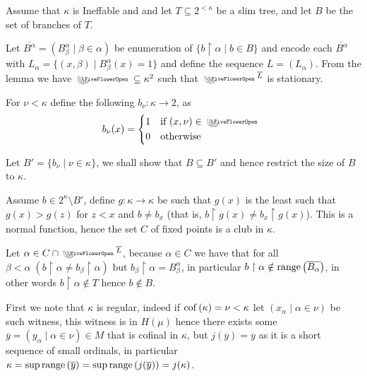 \begin{cExercise}
\begin{cPart}
		
		Assume that $\kappa$ is Ineffable and and let $T\subseteq 2^{<\kappa}$ be a slim tree, and let $B$ be the set of branches of $T$.
		
		Let $\overline{B^\alpha}=(B^\alpha_\beta\mid\beta\in\alpha)$ be enumeration of $\{b\restriction\alpha\mid b\in B\}$ and encode each $\overline{B^\alpha}$ with $L_\alpha=\{(x,\beta)\mid B^\alpha_\beta(x)=1\}$ and define the sequence $\overline{L}=(L_\alpha)$. From the lemma we have $\flower\subseteq \kappa^2$ such that $\flower^{\overline L}$ is stationary.
		
		For $\nu<\kappa$ define the following $b_\nu:\kappa\to 2$, as \begin{equation}
			b_\nu(x) =
			\begin{cases*}
				1 & if $(x,\nu)\in \flower$ \\
				0       & otherwise
			\end{cases*}
		\end{equation} 
		
		
		Let $B'=\{b_\nu\mid\nu\in\kappa\}$, we shall show that $B\subseteq B'$ and hence restrict the size of $B$ to $\kappa$.
		
		Assume $b\in 2^\kappa\setminus B'$, define $g:\kappa\to\kappa$ be such that $g(x)$ is the least such that $g(x)>g(z)$ for $z<x$ and $b\ne b_x$ (that is, $b\restriction g(x)\ne b_x\restriction g(x)$). This is a normal function, hence the set $C$ of fixed points is a club in $\kappa$.
		
		Let $\alpha\in C\cap \flower^{\overline L}$, because $\alpha\in C$ we have that for all $\beta<\alpha\;(b\restriction\alpha\ne b_\beta\restriction\alpha)$ but $b_\beta\restriction\alpha=B^\alpha_\beta$, in particular $b\restriction\alpha\notin \operatorname{range}\left(\overline{B_\alpha}\right)$, in other words $b\restriction\alpha\notin T$ hence $b\notin B$.
	\end{cPart}
	\begin{cPart}
		First we note that $\kappa$ is regular, indeed if $\operatorname{cof}\left(\kappa\right)=\nu<\kappa$ let $(x_\alpha\mid\alpha\in\nu)$ be such witness, this witness is in $H(\mu)$ hence there exists some $\overline y=(y_\alpha\mid\alpha\in\nu)\in M$ that is cofinal in $\kappa$, but $j(\overline y)=\overline y$ as it is a short sequence of small ordinals, in particular $\kappa=\sup\operatorname{range}\left(\overline y\right)=\sup\operatorname{range}\left(j(\overline y)\right)=j(\kappa)$.
		

\end{cPart}
\end{cExercise}
